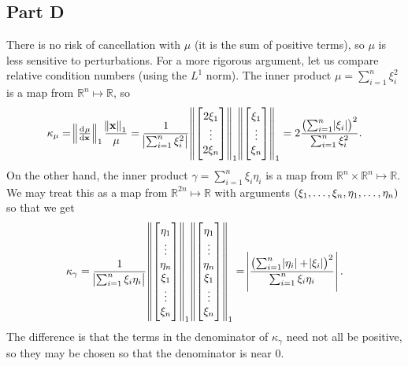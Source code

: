 \documentclass[12pt]{article}
\theoremstyle{definition}
\begin{document}
\subsection*{Part D}
There is no risk of cancellation with $\mu$ (it is the sum of positive terms), so $\mu$ is less sensitive to perturbations. For a more rigorous argument, let us compare relative condition numbers (using the $L^1$ norm). The inner product $\mu = \sum_{i=1}^{n}\xi_i^2$ is a map from $\mathbb{R}^n \mapsto \mathbb{R}$, so
\begin{align*}
\kappa_\mu = 
\norm{\od{\mu}{\bf{x}}}_1\frac{\norm{\bf{x}}_1}{\mu}
=
\frac{1}{\abs{\sum_{i=1}^{n}\xi_i^2}}
\norm{
\begin{bmatrix}
2\xi_1 \\
\vdots \\
2\xi_n
\end{bmatrix}}_1
\norm{
\begin{bmatrix}
\xi_1 \\
\vdots \\
\xi_n
\end{bmatrix}
}_1
=
2\frac{\del{\sum_{i=1}^n\abs{\xi_i}}^2}{\sum_{i=1}^n\xi_i^2}.
\end{align*}
On the other hand, the inner product $\gamma = \sum_{i=1}^n\xi_i\eta_i$ is a map from $\mathbb{R}^n \times \mathbb{R}^n \mapsto \mathbb{R}$. We may treat this as a map from $\mathbb{R}^{2n} \mapsto \mathbb{R}$ with arguments $\del{\xi_1,\dots,\xi_n,\eta_1,\dots,\eta_n}$ so that we get
\begin{align*}
\kappa_\gamma =
\frac{1}{\abs{\sum_{i=1}^{n}\xi_i\eta_i}}
\norm{
\begin{bmatrix}
\eta_1 \\
\vdots \\
\eta_n \\
\xi_1 \\
\vdots \\
\xi_n
\end{bmatrix}}_1
\norm{
\begin{bmatrix}
\eta_1 \\
\vdots \\
\eta_n \\
\xi_1 \\
\vdots \\
\xi_n
\end{bmatrix}}_1
=
\abs{\frac{\del{\sum_{i=1}^n \abs{\eta_i} + \abs{\xi_i}}^2}{\sum_{i=1}^{n}\xi_i\eta_i}}.
\end{align*}
The difference is that the terms in the denominator of $\kappa_\gamma$ need not all be positive, so they may be chosen so that the denominator is near $0$.
\end{document}
